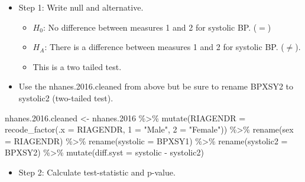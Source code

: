 \documentclass[
  letterpaper,
  DIV=11,
  numbers=noendperiod]{scrreprt}
\newenvironment{Shaded}{\begin{snugshade}}{\end{snugshade}}
\newcommand{\AttributeTok}[1]{\textcolor[rgb]{0.40,0.45,0.13}{#1}}
\newcommand{\ConstantTok}[1]{\textcolor[rgb]{0.56,0.35,0.01}{#1}}
\newcommand{\FloatTok}[1]{\textcolor[rgb]{0.68,0.00,0.00}{#1}}
\newcommand{\FunctionTok}[1]{\textcolor[rgb]{0.28,0.35,0.67}{#1}}
\newcommand{\NormalTok}[1]{\textcolor[rgb]{0.00,0.23,0.31}{#1}}
\newcommand{\OtherTok}[1]{\textcolor[rgb]{0.00,0.23,0.31}{#1}}
\newcommand{\SpecialCharTok}[1]{\textcolor[rgb]{0.37,0.37,0.37}{#1}}
\newcommand{\StringTok}[1]{\textcolor[rgb]{0.13,0.47,0.30}{#1}}
\providecommand{\tightlist}{%
  \setlength{\itemsep}{0pt}\setlength{\parskip}{0pt}}\usepackage{longtable,booktabs,array}
\begin{document}
\begin{itemize}
\tightlist
\item
  Step 1: Write null and alternative.

  \begin{itemize}
  \tightlist
  \item
    \(H_0\): No difference between measures 1 and 2 for systolic BP.
    (\(=\))
  \item
    \(H_A\): There is a difference between measures 1 and 2 for systolic
    BP. (\(\neq\)).
  \item
    This is a two tailed test.
  \end{itemize}
\item
  Use the nhanes.2016.cleaned from above but be sure to rename BPXSY2 to
  systolic2 (two-tailed test).
\end{itemize}

\begin{Shaded}
\begin{Highlighting}[]
\NormalTok{nhanes.}\FloatTok{2016.}\NormalTok{cleaned }\OtherTok{\textless{}{-}}\NormalTok{ nhanes}\FloatTok{.2016} \SpecialCharTok{\%\textgreater{}\%}
    \FunctionTok{mutate}\NormalTok{(}\AttributeTok{RIAGENDR =} \FunctionTok{recode\_factor}\NormalTok{(}\AttributeTok{.x =}\NormalTok{ RIAGENDR, }\StringTok{\textasciigrave{}}\AttributeTok{1}\StringTok{\textasciigrave{}} \OtherTok{=} \StringTok{"Male"}\NormalTok{, }\StringTok{\textasciigrave{}}\AttributeTok{2}\StringTok{\textasciigrave{}} \OtherTok{=} \StringTok{"Female"}\NormalTok{)) }\SpecialCharTok{\%\textgreater{}\%}
    \FunctionTok{rename}\NormalTok{(}\AttributeTok{sex =}\NormalTok{ RIAGENDR) }\SpecialCharTok{\%\textgreater{}\%}
    \FunctionTok{rename}\NormalTok{(}\AttributeTok{systolic =}\NormalTok{ BPXSY1) }\SpecialCharTok{\%\textgreater{}\%}
    \FunctionTok{rename}\NormalTok{(}\AttributeTok{systolic2 =}\NormalTok{ BPXSY2) }\SpecialCharTok{\%\textgreater{}\%}
    \FunctionTok{mutate}\NormalTok{(}\AttributeTok{diff.syst =}\NormalTok{ systolic }\SpecialCharTok{{-}}\NormalTok{ systolic2)}
\end{Highlighting}
\end{Shaded}

\begin{itemize}
\tightlist
\item
  Step 2: Calculate test-statistic and p-value.
\end{itemize}

\begin{Shaded}
\end{Shaded}
\end{document}
